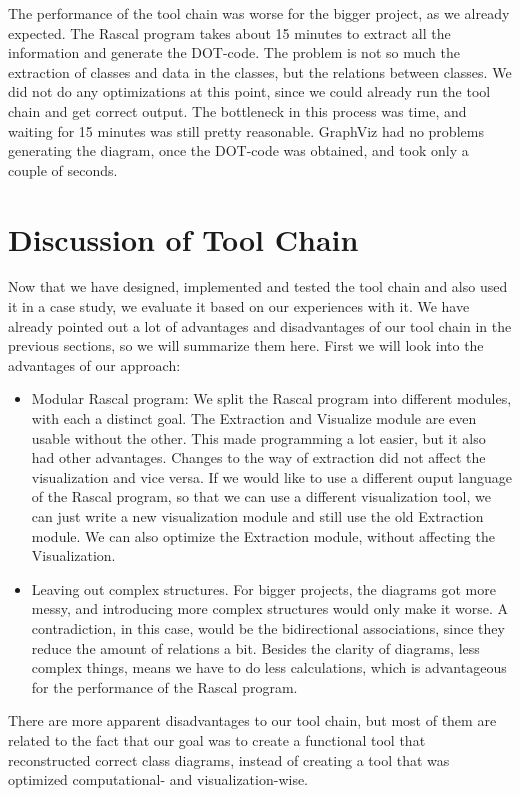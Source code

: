 \documentclass[a4paper,11pt]{article}
\begin{document}
			The performance of the tool chain was worse for the bigger project, as we already expected. The Rascal program takes about 15 minutes to extract all the information and generate the DOT-code. The problem is not so much the extraction of classes and data in the classes, but the relations between classes. We did not do any optimizations at this point, since we could already run the tool chain and get correct output. The bottleneck in this process was time, and waiting for 15 minutes was still pretty reasonable. GraphViz had no problems generating the diagram, once the DOT-code was obtained, and took only a couple of seconds.
			
	\section{Discussion of Tool Chain}
		Now that we have designed, implemented and tested the tool chain and also used it in a case study, we evaluate it based on our experiences with it. We have already pointed out a lot of advantages and disadvantages of our tool chain in the previous sections, so we will summarize them here. First we will look into the advantages of our approach:
		
		\begin{itemize}
			\item Modular Rascal program: We split the Rascal program into different modules, with each a distinct goal. The Extraction and Visualize module are even usable without the other. This made programming a lot easier, but it also had other advantages. Changes to the way of extraction did not affect the visualization and vice versa. If we would like to use a different ouput language of the Rascal program, so that we can use a different visualization tool, we can just write a new visualization module and still use the old Extraction module. We can also optimize the Extraction module, without affecting the Visualization.
			\item Leaving out complex structures. For bigger projects, the diagrams got more messy, and introducing more complex structures would only make it worse. A contradiction, in this case, would be the bidirectional associations, since they reduce the amount of relations a bit. Besides the clarity of diagrams, less complex things, means we have to do less calculations, which is advantageous for the performance of the Rascal program.
		\end{itemize}
		
		There are more apparent disadvantages to our tool chain, but most of them are related to the fact that our goal was to create a functional tool that reconstructed correct class diagrams, instead of creating a tool that was optimized computational- and visualization-wise.
\end{document}
